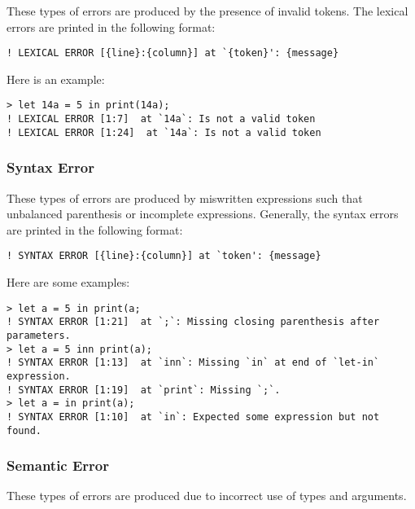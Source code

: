 \documentclass[a4paper, 12pt]{report}
\begin{document}
These types of errors are produced by the presence of invalid tokens. The lexical errors 
are printed in the following format:

\begin{lstlisting}
! LEXICAL ERROR [{line}:{column}] at `{token}': {message}
\end{lstlisting}

Here is an example:

\begin{lstlisting}
> let 14a = 5 in print(14a);
! LEXICAL ERROR [1:7]  at `14a`: Is not a valid token
! LEXICAL ERROR [1:24]  at `14a`: Is not a valid token
\end{lstlisting}

\subsubsection*{Syntax Error}

These types of errors are produced by miswritten expressions such that unbalanced parenthesis
or incomplete expressions. Generally, the syntax errors are printed in the following format:

\begin{lstlisting}
! SYNTAX ERROR [{line}:{column}] at `token': {message}
\end{lstlisting}

Here are some examples:

\begin{lstlisting}
> let a = 5 in print(a;
! SYNTAX ERROR [1:21]  at `;`: Missing closing parenthesis after parameters.
> let a = 5 inn print(a);
! SYNTAX ERROR [1:13]  at `inn`: Missing `in` at end of `let-in` expression.
! SYNTAX ERROR [1:19]  at `print`: Missing `;`.
> let a = in print(a);
! SYNTAX ERROR [1:10]  at `in`: Expected some expression but not found.
\end{lstlisting}

\subsubsection*{Semantic Error}

These types of errors are produced due to incorrect use of types and arguments. 
\end{document}
